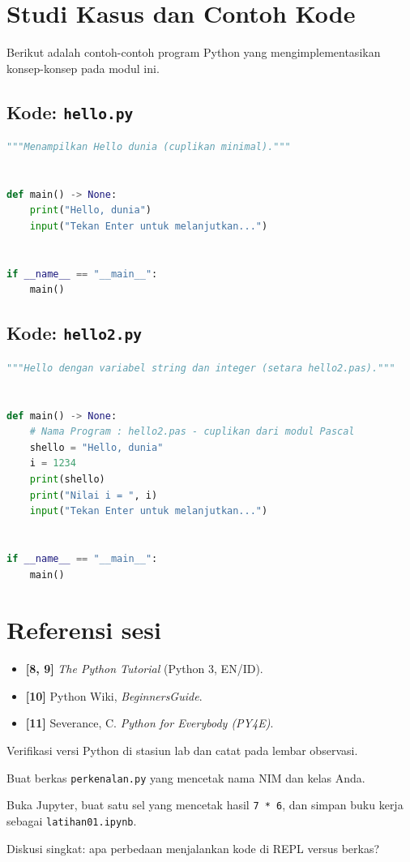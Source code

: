 \documentclass[../main.tex]{subfiles}
\begin{document}
\section{Studi Kasus dan Contoh Kode}

Berikut adalah contoh-contoh program Python yang mengimplementasikan konsep-konsep pada modul ini.

\subsection{Kode: \texttt{hello.py}}
\begin{lstlisting}[language=Python,caption={\texttt{hello.py}}]
"""Menampilkan Hello dunia (cuplikan minimal)."""


def main() -> None:
    print("Hello, dunia")
    input("Tekan Enter untuk melanjutkan...")


if __name__ == "__main__":
    main()
\end{lstlisting}

\subsection{Kode: \texttt{hello2.py}}
\begin{lstlisting}[language=Python,caption={\texttt{hello2.py}}]
"""Hello dengan variabel string dan integer (setara hello2.pas)."""


def main() -> None:
    # Nama Program : hello2.pas - cuplikan dari modul Pascal
    shello = "Hello, dunia"
    i = 1234
    print(shello)
    print("Nilai i = ", i)
    input("Tekan Enter untuk melanjutkan...")


if __name__ == "__main__":
    main()
\end{lstlisting}

\section{Referensi sesi}

\begin{itemize}[leftmargin=*]
  \item \textbf{[8, 9]} \textit{The Python Tutorial} (Python 3, EN/ID).
  \item \textbf{[10]} Python Wiki, \textit{BeginnersGuide}.
  \item \textbf{[11]} Severance, C. \textit{Python for Everybody (PY4E)}.
\end{itemize}

\begin{aktivitas}
  \item Verifikasi versi Python di stasiun lab dan catat pada lembar observasi.
  \item Buat berkas \texttt{perkenalan.py} yang mencetak nama NIM dan kelas Anda.
  \item Buka Jupyter, buat satu sel yang mencetak hasil \texttt{7 * 6}, dan simpan buku kerja sebagai \texttt{latihan01.ipynb}.
  \item Diskusi singkat: apa perbedaan menjalankan kode di REPL versus berkas?
\end{aktivitas}
\end{document}
